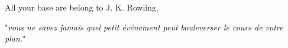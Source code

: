 All your base are belong to J. K. Rowling.

"\emph{vous ne savez jamais quel petit événement peut bouleverser le cours de votre plan.}"

